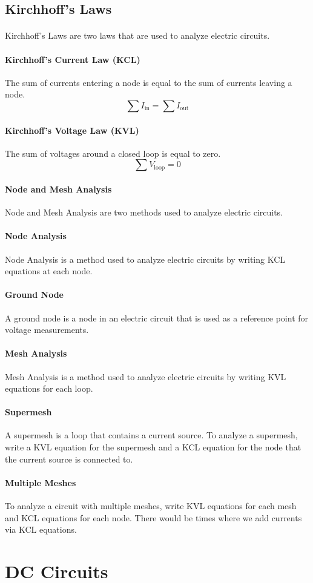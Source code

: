 \documentclass[11pt]{article}
\begin{document}
\subsection{Kirchhoff's Laws}
\paragraph{} Kirchhoff's Laws are two laws that are used to analyze electric circuits.
\paragraph{Kirchhoff's Current Law (KCL)} The sum of currents entering a node is equal to the sum of currents leaving a node.
\begin{equation}
    \sum I_{\text{in}} = \sum I_{\text{out}}
\end{equation}
\paragraph{Kirchhoff's Voltage Law (KVL)} The sum of voltages around a closed loop is equal to zero.
\begin{equation}
    \sum V_{\text{loop}} = 0
\end{equation}
\paragraph{Node and Mesh Analysis} Node and Mesh Analysis are two methods used to analyze electric circuits.
\paragraph{Node Analysis} Node Analysis is a method used to analyze electric circuits by writing KCL equations at each node.
\paragraph{Ground Node} A ground node is a node in an electric circuit that is used as a reference point for voltage measurements.
\paragraph{Mesh Analysis} Mesh Analysis is a method used to analyze electric circuits by writing KVL equations for each loop.
\paragraph{Supermesh} A supermesh is a loop that contains a current source. To analyze a supermesh, write a KVL equation for the supermesh and a KCL equation for the node that the current source is connected to.
\paragraph{Multiple Meshes} To analyze a circuit with multiple meshes, write KVL equations for each mesh and KCL equations for each node. There would be times where we add currents via KCL equations.

\section{DC Circuits}
\paragraph{}
\end{document}
